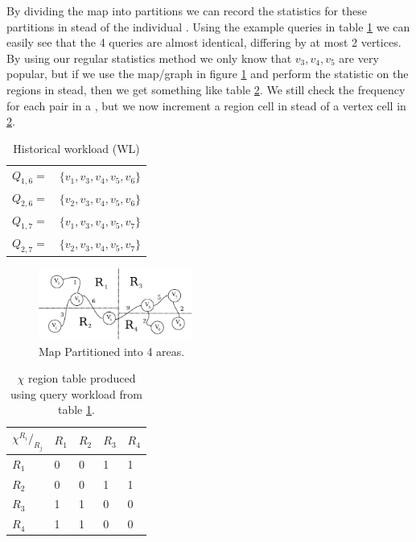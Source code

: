 By dividing the map into partitions we can record the statistics for these partitions in stead of the individual \spathsns. Using the example queries in table \ref{tab:queries2} we can easily see that the 4 queries are almost identical, differing by at most 2 vertices. By using our regular statistics method we only know that $v_3,v_4,v_5$ are very popular, but if we use the map/graph in figure \ref{fig:mappartition} and perform the statistic on the regions in stead, then we get something like table \ref{tab:rchitable}. We still check the frequency for each pair in a 
\spathns, but we now increment a region cell in stead of a vertex cell in \ref{tab:rchitable}. 


\begin{table}
\center
\begin{tabular}{l l}
$Q_{1,6} =$ 	& $\{v_1,v_3,v_4,v_5,v_6\}$\\
$Q_{2,6} =$ 	& $\{v_2,v_3,v_4,v_5,v_6\}$ \\
$Q_{1,7} =$ 	& $\{v_1,v_3,v_4,v_5,v_7\}$ \\
$Q_{2,7} =$ 	& $\{v_2,v_3,v_4,v_5,v_7\}$ \\
\end{tabular}
\caption{Historical workload (WL)}
\label{tab:queries2}
\end{table}


\begin{figure}[bht]
  \center
        \includegraphics[width=0.45\textwidth]{figures/mappartition}
        \caption{Map Partitioned into 4 areas.}
  \label{fig:mappartition}
\end{figure}

\begin{table}[!Htb]
\center
\begin{tabular}{|l||l|l|l|l|}
\textbf{$\chi {^{R_i}/_{R_j}}$}	& $R_1$		& $R_2$		& $R_3$		& $R_4$\\\hline
$R_1$			& 0		& 0		& 1		& 1 \\
$R_2$			& 0		& 0		& 1	 	& 1 \\
$R_3$			& 1		& 1		& 0	 	& 0 \\
$R_4$			& 1		& 1		& 0	 	& 0 \\
\end{tabular}
\caption{$\chi$ region table produced using query workload from table \ref{tab:queries2}.}
\label{tab:rchitable}
\end{table}


